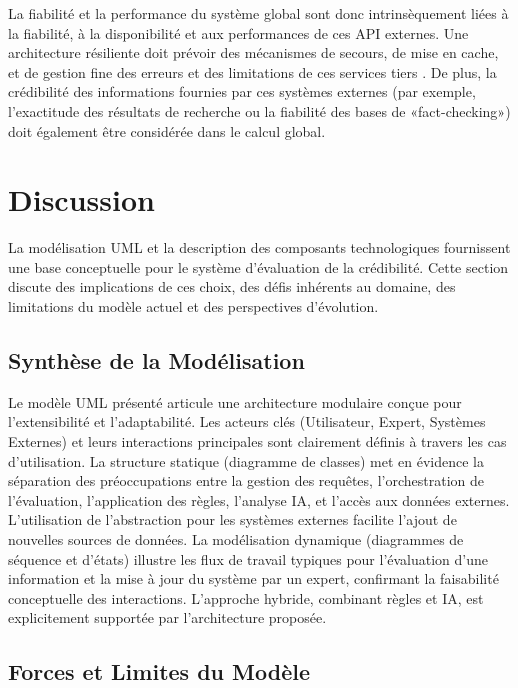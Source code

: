 \documentclass[9pt,twocolumn,french]{article}
\begin{document}
La fiabilité et la performance du système global sont donc intrinsèquement liées à la fiabilité, à la disponibilité et aux performances de ces API externes. Une architecture résiliente doit prévoir des mécanismes de secours, de mise en cache, et de gestion fine des erreurs et des limitations de ces services tiers \citep{GoogleSearchAPI, microsoft_bing}. De plus, la crédibilité des informations fournies par ces systèmes externes (par exemple, l'exactitude des résultats de recherche ou la fiabilité des bases de «fact-checking») doit également être considérée dans le calcul global.

\section{Discussion}

La modélisation UML et la description des composants technologiques fournissent une base conceptuelle pour le système d'évaluation de la crédibilité. Cette section discute des implications de ces choix, des défis inhérents au domaine, des limitations du modèle actuel et des perspectives d'évolution.

\subsection{Synthèse de la Modélisation}

Le modèle UML présenté articule une architecture modulaire conçue pour l'extensibilité et l'adaptabilité. Les acteurs clés (Utilisateur, Expert, Systèmes Externes) et leurs interactions principales sont clairement définis à travers les cas d'utilisation. La structure statique (diagramme de classes) met en évidence la séparation des préoccupations entre la gestion des requêtes, l'orchestration de l'évaluation, l'application des règles, l'analyse IA, et l'accès aux données externes. L'utilisation de l'abstraction pour les systèmes externes facilite l'ajout de nouvelles sources de données. La modélisation dynamique (diagrammes de séquence et d'états) illustre les flux de travail typiques pour l'évaluation d'une information et la mise à jour du système par un expert, confirmant la faisabilité conceptuelle des interactions. L'approche hybride, combinant règles et IA, est explicitement supportée par l'architecture proposée.

\subsection{Forces et Limites du Modèle}
\end{document}
